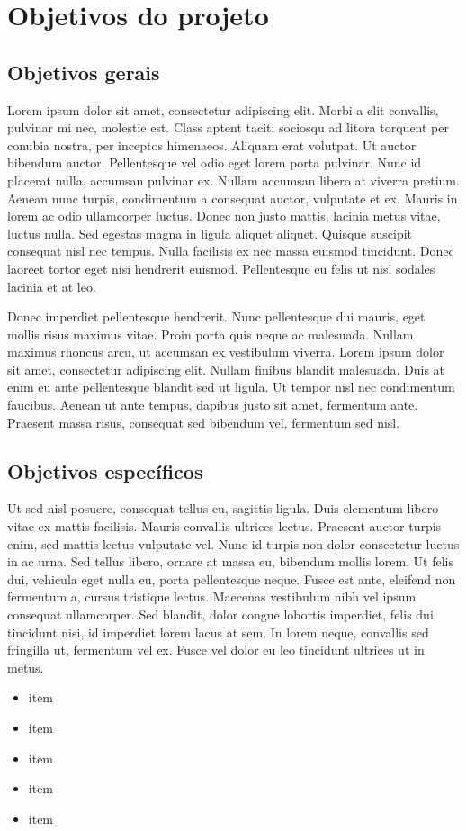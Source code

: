 \section{Objetivos do projeto}
\subsection{Objetivos gerais}

Lorem ipsum dolor sit amet, consectetur adipiscing elit. Morbi a elit convallis, pulvinar mi nec, molestie est. Class aptent taciti sociosqu ad litora torquent per conubia nostra, per inceptos himenaeos. Aliquam erat volutpat. Ut auctor bibendum auctor. Pellentesque vel odio eget lorem porta pulvinar. Nunc id placerat nulla, accumsan pulvinar ex. Nullam accumsan libero at viverra pretium. Aenean nunc turpis, condimentum a consequat auctor, vulputate et ex. Mauris in lorem ac odio ullamcorper luctus. Donec non justo mattis, lacinia metus vitae, luctus nulla. Sed egestas magna in ligula aliquet aliquet. Quisque suscipit consequat nisl nec tempus. Nulla facilisis ex nec massa euismod tincidunt. Donec laoreet tortor eget nisi hendrerit euismod. Pellentesque eu felis ut nisl sodales lacinia et at leo.

Donec imperdiet pellentesque hendrerit. Nunc pellentesque dui mauris, eget mollis risus maximus vitae. Proin porta quis neque ac malesuada. Nullam maximus rhoncus arcu, ut accumsan ex vestibulum viverra. Lorem ipsum dolor sit amet, consectetur adipiscing elit. Nullam finibus blandit malesuada. Duis at enim eu ante pellentesque blandit sed ut ligula. Ut tempor nisl nec condimentum faucibus. Aenean ut ante tempus, dapibus justo sit amet, fermentum ante. Praesent massa risus, consequat sed bibendum vel, fermentum sed nisl.

\subsection{Objetivos específicos}

Ut sed nisl posuere, consequat tellus eu, sagittis ligula. Duis elementum libero vitae ex mattis facilisis. Mauris convallis ultrices lectus. Praesent auctor turpis enim, sed mattis lectus vulputate vel. Nunc id turpis non dolor consectetur luctus in ac urna. Sed tellus libero, ornare at massa eu, bibendum mollis lorem. Ut felis dui, vehicula eget nulla eu, porta pellentesque neque. Fusce est ante, eleifend non fermentum a, cursus tristique lectus. Maecenas vestibulum nibh vel ipsum consequat ullamcorper. Sed blandit, dolor congue lobortis imperdiet, felis dui tincidunt nisi, id imperdiet lorem lacus at sem. In lorem neque, convallis sed fringilla ut, fermentum vel ex. Fusce vel dolor eu leo tincidunt ultrices ut in metus.

\begin{itemize}
    \item item
    \item item
    \item item
    \item item
    \item item
\end{itemize}